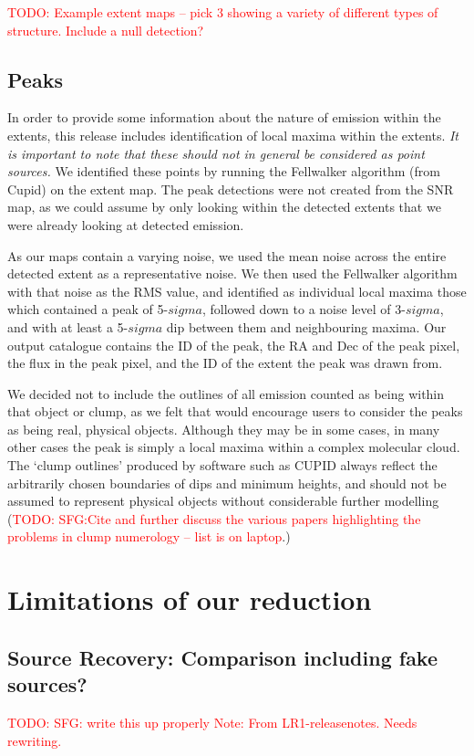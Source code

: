 \documentclass[usenatbib]{mnras}
\newcommand{\todo}[1]{\textcolor{red}{TODO: #1}}
\newcommand{\note}[1]{\textcolor{red}{Note: #1}}
\begin{document}
\todo{Example extent maps -- pick 3 showing a variety of different
  types of structure. Include a null detection?}

\subsection{Peaks}
In order to provide some information about the nature of emission
within the extents, this release includes identification of local
maxima within the extents. \emph{It is important to note that these
  should not in general be considered as point sources.} We identified
these points by running the Fellwalker algorithm (from Cupid) on the
extent map. The peak detections were not created from the SNR map, as
we could assume by only looking within the detected extents that we
were already looking at detected emission.

As our maps contain a varying noise, we used the mean noise across the
entire detected extent as a representative noise. We then used the
Fellwalker algorithm with that noise as the RMS value, and identified
as individual local maxima those which contained a peak of 5-$sigma$,
followed down to a noise level of 3-$sigma$, and with at least a
5-$sigma$ dip between them and neighbouring maxima. Our output
catalogue contains the ID of the peak, the RA and Dec of the peak
pixel, the flux in the peak pixel, and the ID of the extent the peak
was drawn from.

We decided not to include the outlines of all emission counted as
being within that object or clump, as we felt that would encourage
users to consider the peaks as being real, physical objects. Although
they may be in some cases, in many other cases the peak is simply a
local maxima within a complex molecular cloud. The `clump outlines'
produced by software such as CUPID always reflect the arbitrarily
chosen boundaries of dips and minimum heights, and should not be
assumed to represent physical objects without considerable further
modelling (\todo{SFG:Cite and further discuss the various papers
  highlighting the problems in clump numerology -- list is on
  laptop}.)



\section{Limitations of our reduction}


\subsection{Source Recovery: Comparison including fake sources?}
\todo{SFG: write this up properly}
\note{From LR1-releasenotes. Needs rewriting.}
\end{document}
